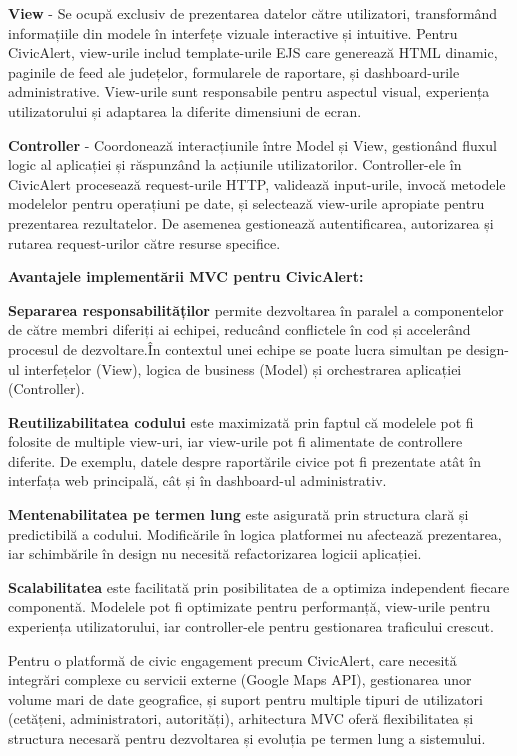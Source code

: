 \documentclass[12pt,a4paper]{report}
\begin{document}
\textbf{View} - Se ocupă exclusiv de prezentarea datelor către utilizatori, transformând informațiile din modele în interfețe vizuale interactive și intuitive. Pentru CivicAlert, view-urile includ template-urile EJS care generează HTML dinamic, paginile de feed ale județelor, formularele de raportare, și dashboard-urile administrative. View-urile sunt responsabile pentru aspectul visual, experiența utilizatorului și adaptarea la diferite dimensiuni de ecran.

\textbf{Controller} - Coordonează interacțiunile între Model și View, gestionând fluxul logic al aplicației și răspunzând la acțiunile utilizatorilor. Controller-ele în CivicAlert procesează request-urile HTTP, validează input-urile, invocă metodele modelelor pentru operațiuni pe date, și selectează view-urile apropiate pentru prezentarea rezultatelor. De asemenea gestionează autentificarea, autorizarea și rutarea request-urilor către resurse specifice.

\textbf{Avantajele implementării MVC pentru CivicAlert:}

\textbf{Separarea responsabilităților} permite dezvoltarea în paralel a componentelor de către membri diferiți ai echipei, reducând conflictele în cod și accelerând procesul de dezvoltare.În contextul unei echipe se  poate lucra simultan pe design-ul interfețelor (View), logica de business (Model) și orchestrarea aplicației (Controller).

\textbf{Reutilizabilitatea codului} este maximizată prin faptul că modelele pot fi folosite de multiple view-uri, iar view-urile pot fi alimentate de controllere diferite. De exemplu, datele despre raportările civice pot fi prezentate atât în interfața web principală, cât și în dashboard-ul administrativ.

\textbf{Mentenabilitatea pe termen lung} este asigurată prin structura clară și predictibilă a codului. Modificările în logica platformei nu afectează prezentarea, iar schimbările în design nu necesită refactorizarea logicii aplicației.

\textbf{Scalabilitatea} este facilitată prin posibilitatea de a optimiza independent fiecare componentă. Modelele pot fi optimizate pentru performanță, view-urile pentru experiența utilizatorului, iar controller-ele pentru gestionarea traficului crescut.

Pentru o platformă de civic engagement precum CivicAlert, care necesită integrări complexe cu servicii externe (Google Maps API), gestionarea unor volume mari de date geografice, și suport pentru multiple tipuri de utilizatori (cetățeni, administratori, autorități), arhitectura MVC oferă flexibilitatea și structura necesară pentru dezvoltarea și evoluția pe termen lung a sistemului.
\end{document}
